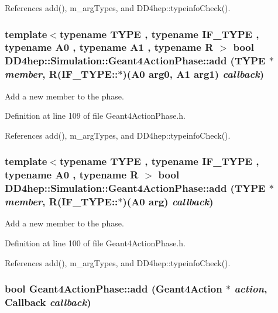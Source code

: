 References add(), m\_\-argTypes, and DD4hep::typeinfoCheck().\hypertarget{class_d_d4hep_1_1_simulation_1_1_geant4_action_phase_ad63f4a395da9d021994d58bd8b1ce015}{
\subsubsection[{add}]{\setlength{\rightskip}{0pt plus 5cm}template$<$typename TYPE , typename IF\_\-TYPE , typename A0 , typename A1 , typename R $>$ bool DD4hep::Simulation::Geant4ActionPhase::add (TYPE $\ast$ {\em member}, \/  R(IF\_\-TYPE::$\ast$)(A0 arg0, A1 arg1) {\em callback})}}
\label{class_d_d4hep_1_1_simulation_1_1_geant4_action_phase_ad63f4a395da9d021994d58bd8b1ce015}


Add a new member to the phase. 

Definition at line 109 of file Geant4ActionPhase.h.

References add(), m\_\-argTypes, and DD4hep::typeinfoCheck().\hypertarget{class_d_d4hep_1_1_simulation_1_1_geant4_action_phase_a3d654d4b6017d6bfa74c4651b9f70bfd}{
\subsubsection[{add}]{\setlength{\rightskip}{0pt plus 5cm}template$<$typename TYPE , typename IF\_\-TYPE , typename A0 , typename R $>$ bool DD4hep::Simulation::Geant4ActionPhase::add (TYPE $\ast$ {\em member}, \/  R(IF\_\-TYPE::$\ast$)(A0 arg) {\em callback})}}
\label{class_d_d4hep_1_1_simulation_1_1_geant4_action_phase_a3d654d4b6017d6bfa74c4651b9f70bfd}


Add a new member to the phase. 

Definition at line 100 of file Geant4ActionPhase.h.

References add(), m\_\-argTypes, and DD4hep::typeinfoCheck().\hypertarget{class_d_d4hep_1_1_simulation_1_1_geant4_action_phase_a61f8e3266a3e0f059539479fd335bb08}{
\subsubsection[{add}]{\setlength{\rightskip}{0pt plus 5cm}bool Geant4ActionPhase::add ({\bf Geant4Action} $\ast$ {\em action}, \/  {\bf Callback} {\em callback})}}
\label{class_d_d4hep_1_1_simulation_1_1_geant4_action_phase_a61f8e3266a3e0f059539479fd335bb08}


